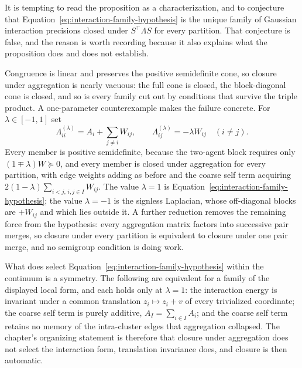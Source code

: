 It is tempting to read the proposition as a characterization, and to conjecture that Equation~\eqref{eq:interaction-family-hypothesis} is the unique family of Gaussian interaction precisions closed under \(S^{\top}\Lambda S\) for every partition. That conjecture is false, and the reason is worth recording because it also explains what the proposition does and does not establish.

Congruence is linear and preserves the positive semidefinite cone, so closure under aggregation is nearly vacuous: the full cone is closed, the block-diagonal cone is closed, and so is every family cut out by conditions that survive the triple product. A one-parameter counterexample makes the failure concrete. For \(\lambda\in[-1,1]\) set
\begin{equation}
\Lambda^{(\lambda)}_{ii}=A_i+\sum_{j\neq i}W_{ij},
\qquad
\Lambda^{(\lambda)}_{ij}=-\lambda W_{ij}
\quad(i\neq j).
\label{eq:lambda-continuum}
\end{equation}
Every member is positive semidefinite, because the two-agent block requires only \((1\mp\lambda)W\succeq 0\), and every member is closed under aggregation for every partition, with edge weights adding as before and the coarse self term acquiring \(2(1-\lambda)\sum_{i<j,\,i,j\in I}W_{ij}\). The value \(\lambda=1\) is Equation~\eqref{eq:interaction-family-hypothesis}; the value \(\lambda=-1\) is the signless Laplacian, whose off-diagonal blocks are \(+W_{ij}\) and which lies outside it. A further reduction removes the remaining force from the hypothesis: every aggregation matrix factors into successive pair merges, so closure under every partition is equivalent to closure under one pair merge, and no semigroup condition is doing work.

What does select Equation~\eqref{eq:interaction-family-hypothesis} within the continuum is a symmetry. The following are equivalent for a family of the displayed local form, and each holds only at \(\lambda=1\): the interaction energy is invariant under a common translation \(z_i\mapsto z_i+v\) of every trivialized coordinate; the coarse self term is purely additive, \(A_I=\sum_{i\in I}A_i\); and the coarse self term retains no memory of the intra-cluster edges that aggregation collapsed. The chapter's organizing statement is therefore that closure under aggregation does not select the interaction form, translation invariance does, and closure is then automatic.

